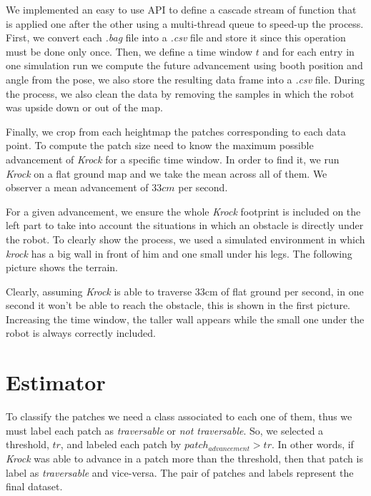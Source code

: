 \documentclass[../document.tex]{subfiles}
\begin{document}
We implemented an easy to use API  to define a cascade stream of function that is applied one after the other using a multi-thread queue to speed-up the process.
First, we convert each \emph{.bag} file into a \emph{.csv} file and store it since this operation must be done only once. Then, we define a time window $t$ and for each entry in one simulation run we compute the future advancement using booth position and angle from the pose, we also store the resulting data frame into a \emph{.csv} file. During the process, we also clean the data by removing the samples in which the robot was upside down or out of the map.

Finally, we crop from each heightmap the patches corresponding to each data point. To compute the patch size need to know the maximum possible advancement of \emph{Krock} for a specific time window. In order to find it, we run \emph{Krock} on a flat ground map and we take the mean across all of them. We observer a mean advancement of $33cm$ per second.

For a given advancement, we ensure the whole \emph{Krock} footprint is included on the left part to take into account the situations in which an obstacle is directly under the robot. To clearly show the process, we used a simulated environment in which \emph{krock} has a big wall in front of him and one small under his legs. The following picture shows the terrain.


Clearly, assuming \emph{Krock} is able to traverse $33$cm of flat ground per second, in one second it won't be able to reach the obstacle, this is shown in the first picture. Increasing the time window, the taller wall appears while the small one under the robot is always correctly included.



\section{Estimator}
To classify the patches we need a class associated to each one of them, thus we must label each patch as \emph{traversable} or \emph{not traversable}. So, we selected a threshold, $tr$, and labeled each patch by $patch_{advancement} > tr$. 
In other words, if \emph{Krock} was able to advance in a patch more than the threshold, then that patch is label as \emph{traversable} and vice-versa. The pair of patches and labels represent the final dataset.
\end{document}
